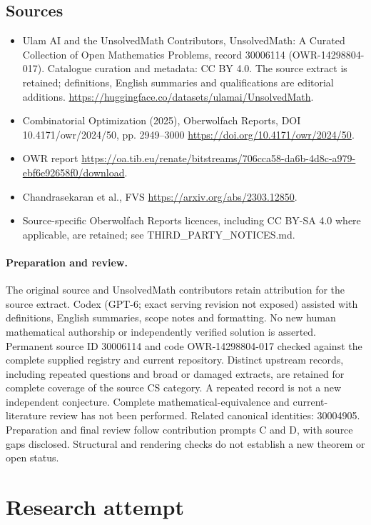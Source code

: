 \documentclass[11pt]{article}
\begin{document}
\subsection{Sources}
\begin{itemize}
\item[S1] Ulam AI and the UnsolvedMath Contributors, UnsolvedMath: A Curated Collection of Open Mathematics Problems, record 30006114 (OWR-14298804-017). Catalogue curation and metadata: CC BY 4.0. The source extract is retained; definitions, English summaries and qualifications are editorial additions.
\url{https://huggingface.co/datasets/ulamai/UnsolvedMath}.
\item[S2] Combinatorial Optimization (2025), Oberwolfach Reports, DOI 10.4171/owr/2024/50, pp. 2949--3000
\url{https://doi.org/10.4171/owr/2024/50}.
\item[S3] OWR report
\url{https://oa.tib.eu/renate/bitstreams/706cca58-da6b-4d8c-a979-ebf6e92658f0/download}.
\item[S4] Chandrasekaran et al., FVS
\url{https://arxiv.org/abs/2303.12850}.
\item Source-specific Oberwolfach Reports licences, including CC BY-SA 4.0 where applicable, are retained; see THIRD\_PARTY\_NOTICES.md.
\end{itemize}
\paragraph{Preparation and review.}
The original source and UnsolvedMath contributors retain attribution for the source extract. Codex (GPT-6; exact serving revision not exposed) assisted with definitions, English summaries, scope notes and formatting. No new human mathematical authorship or independently verified solution is asserted. Permanent source ID 30006114 and code OWR-14298804-017 checked against the complete supplied registry and current repository. Distinct upstream records, including repeated questions and broad or damaged extracts, are retained for complete coverage of the source CS category. A repeated record is not a new independent conjecture. Complete mathematical-equivalence and current-literature review has not been performed. Related canonical identities: 30004905. Preparation and final review follow contribution prompts C and D, with source gaps disclosed. Structural and rendering checks do not establish a new theorem or open status.
\label{end:30006114}

\section{Research attempt}
\end{document}
